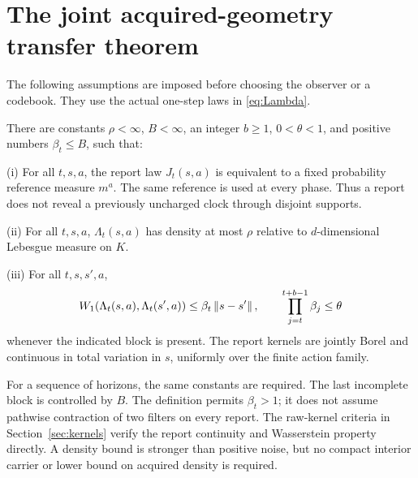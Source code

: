 \section{The joint acquired-geometry transfer theorem}\label{sec:transfer}
The following assumptions are imposed before choosing the observer or a codebook. They use the actual one-step laws in \eqref{eq:Lambda}.

\begin{definition}\label{def:hypotheses}
There are constants $\rho<\infty$, $B<\infty$, an integer $b\ge1$, $0<\theta<1$, and positive numbers $\beta_t\le B$, such that:

\textup{(i)} For all $t,s,a$, the report law $J_t(s,a)$ is equivalent to a fixed probability reference measure $m^a$. The same reference is used at every phase. Thus a report does not reveal a previously uncharged clock through disjoint supports.

\textup{(ii)} For all $t,s,a$, $\Lambda_t(s,a)$ has density at most $\rho$ relative to $d$-dimensional Lebesgue measure on $K$.

\textup{(iii)} For all $t,s,s',a$,
\begin{equation}\label{eq:stability}
 W_1(\Lambda_t(s,a),\Lambda_t(s',a))\le\beta_t\left\lVert s-s'\right\rVert,
 \qquad \prod_{j=t}^{t+b-1}\beta_j\le\theta
\end{equation}
whenever the indicated block is present. The report kernels are jointly Borel and continuous in total variation in $s$, uniformly over the finite action family.
\end{definition}
For a sequence of horizons, the same constants are required. The last incomplete block is controlled by $B$. The definition permits $\beta_t>1$; it does not assume pathwise contraction of two filters on every report. The raw-kernel criteria in Section~\ref{sec:kernels} verify the report continuity and Wasserstein property directly. A density bound is stronger than positive noise, but no compact interior carrier or lower bound on acquired density is required.

